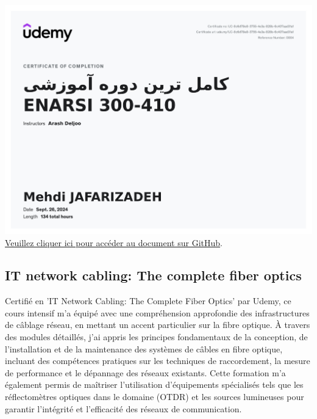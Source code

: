 \documentclass{article}
\begin{document}
        \begin{center}
            \includegraphics[width=\textwidth,height=\textheight,keepaspectratio]{../Document/Certificats de Fin de Cours/CCNP ENARSI 300-410/CCNP ENARSI 300-410.pdf}
            \footnotesize
             \href{https://github.com/jafarizadeh/CV---lettre/tree/00df58c41988ba7488536512caee235bdb5d570d/Document/Certificats%20de%20Fin%20de%20Cours/CCNP%20ENARSI%20300-410}{Veuillez cliquer ici pour accéder au document sur GitHub}.
        \end{center}

    \newpage

    \subsection{IT network cabling: The complete fiber optics}
    \par
    Certifié en 'IT Network Cabling: The Complete Fiber Optics' par Udemy, ce cours intensif m'a équipé avec une compréhension approfondie des infrastructures de câblage réseau, en mettant un accent particulier sur la fibre optique. À travers des modules détaillés, j'ai appris les principes fondamentaux de la conception, de l'installation et de la maintenance des systèmes de câbles en fibre optique, incluant des compétences pratiques sur les techniques de raccordement, la mesure de performance et le dépannage des réseaux existants. Cette formation m'a également permis de maîtriser l'utilisation d'équipements spécialisés tels que les réflectomètres optiques dans le domaine (OTDR) et les sources lumineuses pour garantir l'intégrité et l'efficacité des réseaux de communication.
    
\end{document}
